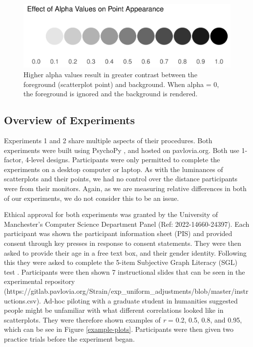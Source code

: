 \documentclass[preprint, 3p,
authoryear]{elsarticle} %
\begin{document}
\begin{figure}

\includegraphics[width=0.5\linewidth]{contrast_and_scatterplots_files/figure-latex/formal-contrast-1} \hfill{}

\caption{\label{formal-contrast}Higher alpha values result in greater contrast between the foreground (scatterplot point) and background. When alpha = 0, the foreground is ignored and the background is rendered.}\label{fig:formal-contrast}
\end{figure}

\hypertarget{overview-of-experiments}{%
\subsection{Overview of Experiments}\label{overview-of-experiments}}

Experiments 1 and 2 share multiple aspects of their procedures. Both
experiments were built using PsychoPy \citep{pierce_psychopy_2019}, and
hosted on pavlovia.org. Both use 1-factor, 4-level designs. Participants
were only permitted to complete the experiments on a desktop computer or
laptop. As with the luminances of scatterplots and their points, we had
no control over the distance participants were from their monitors.
Again, as we are measuring relative differences in both of our
experiments, we do not consider this to be an issue.

Ethical approval for both experiments was granted by the University of
Manchester's Computer Science Department Panel (Ref: 2022-14660-24397).
Each participant was shown the participant information sheet (PIS) and
provided consent through key presses in response to consent statements.
They were then asked to provide their age in a free text box, and their
gender identity. Following this they were asked to complete the 5-item
Subjective Graph Literacy (SGL) test \citep{garcia_2016}. Participants
were then shown 7 instructional slides that can be seen in the
experimental repository
(https://gitlab.pavlovia.org/Strain/exp\_uniform\_adjustments/blob/master/instructions.csv).
Ad-hoc piloting with a graduate student in humanities suggested people
might be unfamiliar with what different correlations looked like in
scatterplots. They were therefore shown examples of \emph{r} = 0.2, 0.5,
0.8, and 0.95, which can be see in Figure \ref{example-plots}.
Participants were then given two practice trials before the experiment
began.
\end{document}
